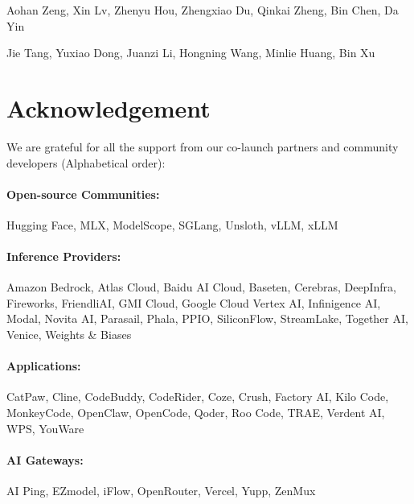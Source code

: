 Aohan Zeng, Xin Lv, Zhenyu Hou, Zhengxiao Du, Qinkai Zheng, Bin Chen, Da Yin

Jie Tang, Yuxiao Dong, Juanzi Li, Hongning Wang, Minlie Huang, Bin Xu


\section*{Acknowledgement}

We are grateful for all the support from our co-launch partners and community developers (Alphabetical order):

\paragraph{Open-source Communities:} Hugging Face, MLX, ModelScope, SGLang, Unsloth, vLLM, xLLM

\paragraph{Inference Providers:} Amazon Bedrock, Atlas Cloud, Baidu AI Cloud, Baseten, Cerebras, DeepInfra, Fireworks, FriendliAI, GMI Cloud, Google Cloud Vertex AI, Infinigence AI, Modal, Novita AI, Parasail, Phala, PPIO, SiliconFlow, StreamLake, Together AI, Venice, Weights \& Biases

\paragraph{Applications:} CatPaw, Cline, CodeBuddy, CodeRider, Coze, Crush, Factory AI, Kilo Code, MonkeyCode, OpenClaw, OpenCode, Qoder, Roo Code, TRAE, Verdent AI, WPS, YouWare

\paragraph{AI Gateways:} AI Ping, EZmodel, iFlow, OpenRouter, Vercel, Yupp, ZenMux